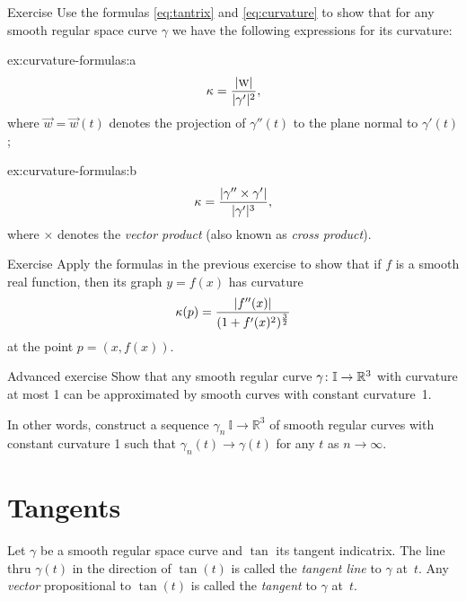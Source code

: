 \begin{thm}{Exercise}\label{ex:curvature-formulas}
Use the formulas \ref{eq:tantrix} and \ref{eq:curvature} to show that 
for any smooth regular space curve $\gamma$ we have the following expressions for its curvature:

\begin{subthm}{ex:curvature-formulas:a} 
\[\kappa=\frac{|\text{\sc{w}}|}{|\gamma'|^2},\]
where $\vec w=\vec w(t)$ denotes the projection of $\gamma''(t)$ to the plane normal to $\gamma'(t)$;
\end{subthm}

\begin{subthm}{ex:curvature-formulas:b}
\[\kappa=\frac{|\gamma''\times \gamma'|}{|\gamma'|^{3}},\]
where $\times$ denotes the \emph{vector product} (also known as \emph{cross product}).
\end{subthm}

\end{thm}


\begin{thm}{Exercise}\label{ex:curvature-graph}
Apply the formulas in the previous exercise to show that if $f$ is a smooth real function,
then its graph $y=f(x)$  has curvature
\[\kappa(p)=\frac{|f''(x)|}{(1+f'(x)^2)^{\frac32}}\]
at the point $p=(x,f(x))$.
\end{thm}

\begin{thm}{Advanced exercise}\label{ex:approximation-const-curvature}
Show that any smooth regular curve $\gamma\:\mathbb{I}\z\to\mathbb{R}^3$ with curvature at most 1 can be approximated by smooth curves with constant curvature~1.

In other words, construct a sequence $\gamma_n\:\mathbb{I}\to\mathbb{R}^3$ of smooth regular curves  with constant curvature 1 such that $\gamma_n(t)\to \gamma(t)$ for any $t$ as $n\to\infty$.
\end{thm}

\section{Tangents}

Let $\gamma$ be a smooth regular space curve and $\tan$ its tangent indicatrix.
The line thru $\gamma(t)$ in the direction of $\tan(t)$ is called the \emph{tangent line} to $\gamma$  at~$t$.
Any \emph{vector} propositional to $\tan(t)$ is called the \emph{tangent} to $\gamma$  at~$t$.

